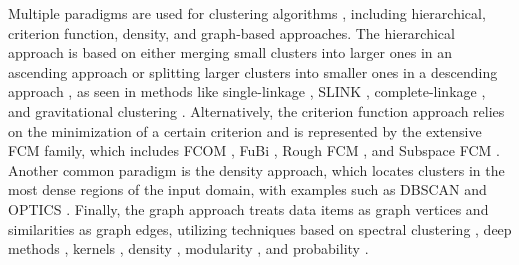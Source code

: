 \documentclass{amcs}
\begin{document}
Multiple paradigms are used for clustering algorithms \cite{id:clustering-alg-survey}, including hierarchical, criterion function, density, and graph-based approaches.
The hierarchical approach is based on either merging small clusters into larger ones in an ascending approach or splitting larger clusters into smaller ones in a descending approach \cite{id:clustering-alg-survey}, as seen in methods like single-linkage \cite{id:Florek1951Sur,id:Sneath1957Application}, SLINK \cite{id:Sibson1973SLINK}, complete-linkage \cite{id:Sorensen1948Method}, and gravitational clustering \cite{id:Wright1977Gravitational}. 
Alternatively, the criterion function approach relies on the minimization of a certain criterion and is represented by the extensive FCM family, which includes FCOM \cite{id:Leski2016FuzzyC}, FuBi \cite{id:Siminski2022FuBiNFS}, Rough FCM \cite{id:Siminski2014Rough,id:Siminski2013Clustering}, and Subspace FCM \cite{id:Siminski2014Neuro}. 
Another common paradigm is the density approach, which locates clusters in the most dense regions of the input domain, with examples such as DBSCAN \cite{id:dbscan-algorithm,id:Suchy2023GrDBSCAN} and OPTICS \cite{id:optics-algorithm}. 
Finally, the graph approach treats data items as graph vertices and similarities as graph edges, utilizing techniques based on spectral clustering \cite{id:Nie2024Novel}, deep methods \cite{id:Ren2024Dynamic}, kernels \cite{id:Liu2024Local}, density \cite{id:Tang2025Density}, modularity \cite{id:Bhowmick2024DGcluster}, and probability \cite{id:Wang2025Bidirectional}.

\end{document}
